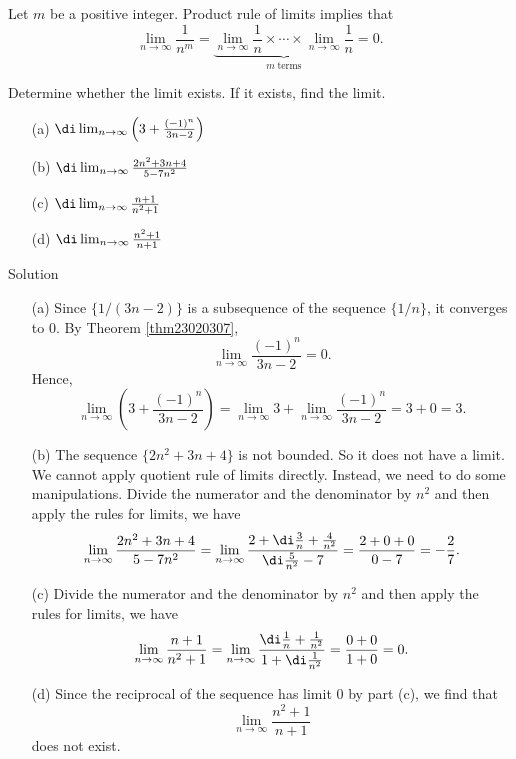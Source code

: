  \begin{example}{}
Let $m$ be a positive integer.  
Product rule of limits implies that
\[\lim_{n\rightarrow\infty}\frac{1}{n^m}=\underbrace{\lim_{n\rightarrow\infty}\frac{1}{n}\times\cdots\times\lim_{n\rightarrow\infty}\frac{1}{n}}_{m\;\text{terms}}=0.\]
\end{example}
 

\begin{example}{}
Determine whether the limit exists. If it exists, find the limit.
\begin{enumerate}
\item[(a)]
$\di\lim_{n\rightarrow \infty}\left(3+\frac{(-1)^n}{3n-2}\right)$
\item[(b)]
$\di \lim_{n\rightarrow\infty}\frac{2n^2+3n+4}{5-7n^2}$

\item[(c)] $\di \lim_{n\rightarrow\infty}\frac{n+1}{n^2+1}$
\item[(d)]
$\di \lim_{n\rightarrow\infty}\frac{n^2+1}{n+1}$
\end{enumerate}
\end{example}
\begin{solution}{Solution}
\begin{enumerate}
\item[(a)]
Since $\{1/(3n-2)\}$ is a subsequence of the sequence $\{1/n\}$, it converges to $0$. By Theorem \ref{thm23020307},
\[\lim_{n\rightarrow \infty}\frac{(-1)^n}{3n-2}=0.\] 
Hence,
\[\lim_{n\rightarrow \infty}\left(3+\frac{(-1)^n}{3n-2}\right)=\lim_{n\rightarrow \infty} 3+\lim_{n\rightarrow \infty}\frac{(-1)^n}{3n-2}=3+0=3.\]
\item[(b)] The sequence $\{2n^2+3n+4\}$ is not bounded. So it does not have a limit. We cannot apply quotient rule of limits directly. Instead,  we need to do some manipulations. Divide the numerator and the denominator by $n^2$ and then apply the rules for limits, we have
\[\lim_{n\rightarrow\infty}\frac{2n^2+3n+4}{5-7n^2}=\lim_{n\rightarrow\infty}\frac{2+\di\frac{3}{n}+\frac{4}{n^2}}{\di \frac{5}{n^2}-7}=\frac{2+0+0}{0-7}=-\frac{2}{7}.\]
\end{enumerate}
\end{solution}
\begin{solution}{ }
\begin{enumerate}
\item[(c)]
Divide the numerator and the denominator by $n^2$ and then apply the rules for limits, we have
\[\lim_{n\rightarrow\infty}\frac{n+1}{n^2+1}=\lim_{n\rightarrow\infty}\frac{\di \frac{1}{n}+\frac{1}{n^2}}{1+\di \frac{1}{n^2}}=\frac{0+0}{1+0}=0.\]
\item[(d)] Since the reciprocal of the sequence has limit 0 by part (c), we find that
\[ \lim_{n\rightarrow\infty}\frac{n^2+1}{n+1}\] does not exist.
\end{enumerate}
\end{solution}

